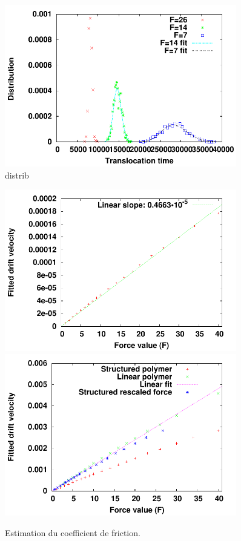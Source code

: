 \documentclass[a4paper,11pt]{article}
\begin{document}
\begin{figure}[H]
\begin{center}
\includegraphics[width=0.9\textwidth]{distriblargepore.pdf} 
\caption{distrib}
\label{holebiggerdistrib}
\end{center}
\end{figure}




\begin{figure}[H]
\begin{center}
\includegraphics[width=0.9\textwidth]{translofrictioncoefflargepore.pdf}
\includegraphics[width=0.9\textwidth]{largeporesfirction.pdf}



\caption{Estimation du coefficient de friction.}
\label{frictionholebigger}
\end{center}
\end{figure}
\end{document}
